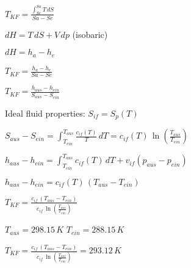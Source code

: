 \( T_{KF} = \frac{\int_{Se}^{Sa} T \, dS}{Sa - Se} \)  

\( dH = T \, dS + V \, dp \) (isobaric)  

\( dH = h_a - h_e \)  

\( T_{KF} = \frac{h_a - h_e}{Sa - Se} \)  

\( T_{KF} = \frac{h_{aus} - h_{ein}}{S_{aus} - S_{ein}} \)  

Ideal fluid properties:  
\( S_{if} = S_p(T) \)  

\( S_{aus} - S_{ein} = \int_{T_{ein}}^{T_{aus}} \frac{c_{if}(T)}{T} \, dT = c_{if}(T) \, \ln\left(\frac{T_{aus}}{T_{ein}}\right) \)  

\( h_{aus} - h_{ein} = \int_{T_{ein}}^{T_{aus}} c_{if}(T) \, dT + v_{if}(p_{aus} - p_{ein}) \)  

\( h_{aus} - h_{ein} = c_{if}(T) \, (T_{aus} - T_{ein}) \)  

\( T_{KF} = \frac{c_{if} \, (T_{aus} - T_{ein})}{c_{if} \, \ln\left(\frac{T_{aus}}{T_{ein}}\right)} \)  

\( T_{aus} = 298.15 \, K \)  
\( T_{ein} = 288.15 \, K \)  

\( T_{KF} = \frac{c_{if} \, (T_{aus} - T_{ein})}{c_{if} \, \ln\left(\frac{T_{aus}}{T_{ein}}\right)} = 293.12 \, K \)